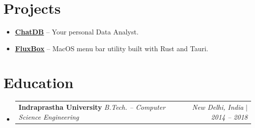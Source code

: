 \documentclass[letterpaper,10pt]{article}
\makeatletter
\newcommand{\resumeSubheading}[4]{
\vspace{-1pt}\item
  \begin{tabular*}{0.97\textwidth}[t]{l@{\extracolsep{\fill}}r}
    \textbf{#1} \hspace{0.4em}\textbar\hspace{0.4em} \textit{#3} & \textit{#4} $|$ \textit{#2} \\
  \end{tabular*}\vspace{-2pt}
}
\newcommand{\resumeSubHeadingList}{\begin{itemize}[leftmargin=0.15in, label={}]}
\newcommand{\resumeSubHeadingListEnd}{\end{itemize}}
\makeatother
\begin{document}
\section{Projects}
\begin{itemize}[leftmargin=1.4em,label=•,topsep=4pt,itemsep=4pt,parsep=0pt]
  \item \small{\href{https://chatdb.raunaqness.com/}{\underline{\textbf{ChatDB}}} -- Your personal Data Analyst.}
  \item \small{\href{https://fluxbox.raunaqness.com/}{\underline{\textbf{FluxBox}}} -- MacOS menu bar utility built with Rust and Tauri.}
\end{itemize}

\section{Education}
\resumeSubHeadingList
  \resumeSubheading
      {Indraprastha University}{2014 -- 2018}
      {B.Tech. -- Computer Science Engineering}{New Delhi, India}
\resumeSubHeadingListEnd
\end{document}
